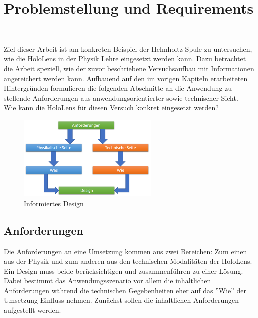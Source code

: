 \section{Problemstellung und Requirements}
\label{sec-3}
\begin{center}
	\\
\end{center}

Ziel dieser Arbeit ist am konkreten Beispiel der Helmholtz-Spule zu untersuchen, wie die HoloLens in der Physik Lehre eingesetzt werden kann. Dazu betrachtet die Arbeit speziell, wie der zuvor beschriebene Versuchsaufbau mit Informationen angereichert werden kann. Aufbauend auf den im vorigen Kapiteln erarbeiteten Hintergründen formulieren die folgenden Abschnitte an die Anwendung zu stellende Anforderungen aus anwendungsorientierter sowie technischer Sicht.\\

Wie kann die HoloLens für diesen Versuch konkret eingesetzt werden?\\

\begin{figure}[h!]
	\centering
	\includegraphics[width=0.6\textwidth]{images/Informiertes_Design.png}
	\caption{Informiertes Design}
	\label{img:Informiertes_Design}
\end{figure}

\subsection{Anforderungen}
\label{sec-3-1}
Die Anforderungen an eine Umsetzung kommen aus zwei Bereichen: Zum einen aus der Physik und zum anderen aus den technischen Modalitäten der HoloLens. Ein Design muss beide berücksichtigen und zusammenführen zu einer Lösung. Dabei bestimmt das Anwendungsszenario vor allem die inhaltlichen Anforderungen während die technischen Gegebenheiten eher auf das ''Wie'' der Umsetzung Einfluss nehmen. Zunächst sollen die inhaltlichen Anforderungen aufgestellt werden.


